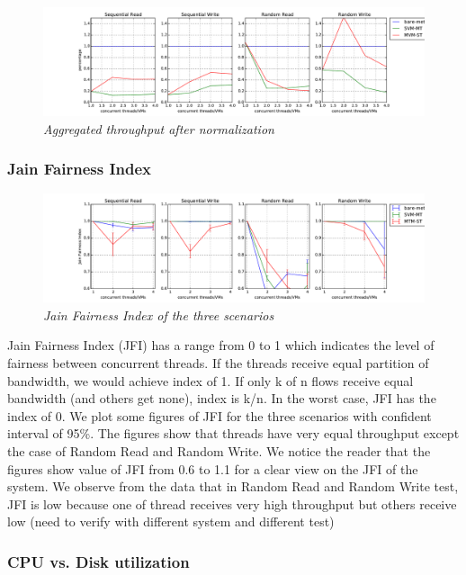\documentclass{acmsig}
\begin{document}
\begin{figure}[t]
  \includegraphics[scale=0.5]{nml_throughput}
  \caption{\textit{Aggregated throughput after normalization}}
  \label{fig:nml_throughput}
\end{figure}

\subsubsection{Jain Fairness Index}

\begin{figure}[t]
  \includegraphics[scale=0.5]{JFI}
  \caption{\textit{Jain Fairness Index of the three scenarios}}
  \label{fig:jfi}
\end{figure}

Jain Fairness Index (JFI) has a range from 0 to 1 which indicates the level of fairness between concurrent threads. If the threads receive equal partition of bandwidth, we would achieve index of 1. If only k of n flows receive equal bandwidth (and others get none), index is k/n. In the worst case, JFI has the index of 0. We plot some figures of JFI for the three scenarios with confident interval of 95\%. The figures show that threads have very equal throughput except the case of Random Read and Random Write. We notice the reader that the figures show value of JFI from 0.6 to 1.1 for a clear view on the JFI of the system. We observe from the data that in Random Read and Random Write test, JFI is low because one of thread receives very high throughput but others receive low (need to verify with different system and different test) 

\subsubsection{CPU vs. Disk utilization}
\end{document}
